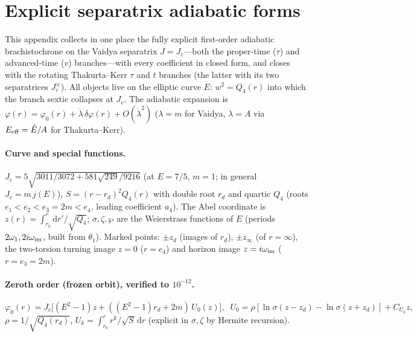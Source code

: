 \documentclass[12pt]{iopart}
\newcommand{\Ehat}{\hat E}
\newcommand{\Jc}{J_{c}}
\newcommand{\dd}{\mathrm{d}}
\begin{document}
\section{Explicit separatrix adiabatic forms}
\label{app:separatrix}
This appendix collects in one place the fully explicit first-order adiabatic
brachistochrone on the Vaidya separatrix $J=\Jc$---both the proper-time ($\tau$) and
advanced-time ($v$) branches---with every coefficient in closed form, and closes with
the rotating Thakurta--Kerr $\tau$ and $t$ branches (the latter with its two
separatrices $\Jc^\pm$). All objects live on the elliptic curve $E:\,w^2=Q_4(r)$ into
which the branch sextic collapses at $\Jc$. The adiabatic expansion is
$\varphi(r)=\varphi_0(r)+\dot\lambda\,\delta\varphi(r)+O(\dot\lambda^2)$
($\lambda=m$ for Vaidya, $\lambda=A$ via $E_{\rm eff}=\Ehat/A$ for Thakurta--Kerr).

\paragraph{Curve and special functions.}
$\Jc=5\sqrt{3011/3072+581\sqrt{249}/9216}$ (at $E=7/5,\,m=1$; in general $\Jc=m\,j(E)$),
$S=(r-r_d)^2Q_4(r)$ with double root $r_d$ and quartic $Q_4$ (roots
$e_1<e_2<e_3=2m<e_4$, leading coefficient $a_4$). The Abel coordinate is
$z(r)=\int_{r_0}^r\dd r'/\sqrt{Q_4}$; $\sigma,\zeta,\wp$ are the Weierstrass functions
of $E$ (periods $2\omega_1,2i\omega_{\rm im}$, built from $\theta_1$). Marked points:
$\pm z_d$ (images of $r_d$), $\pm z_\infty$ (of $r=\infty$), the two-torsion turning
image $z=0$ ($r=e_4$) and horizon image $z=i\omega_{\rm im}$ ($r=e_3=2m$).

\paragraph{Zeroth order (frozen orbit), verified to $10^{-12}$.}
\begin{equation}
\varphi_0(r)=\Jc\big[(E^2-1)z+((E^2-1)r_d+2m)\,U_0(z)\big],\;\;
U_0=\rho[\ln\sigma(z{-}z_d)-\ln\sigma(z{+}z_d)]+C_{U_0}z,
\end{equation}
$\rho=1/\sqrt{Q_4(r_d)}$, $U_k=\int_{r_0}^r r^k/\sqrt S\,\dd r$ (explicit in
$\sigma,\zeta$ by Hermite recursion).
\end{document}
